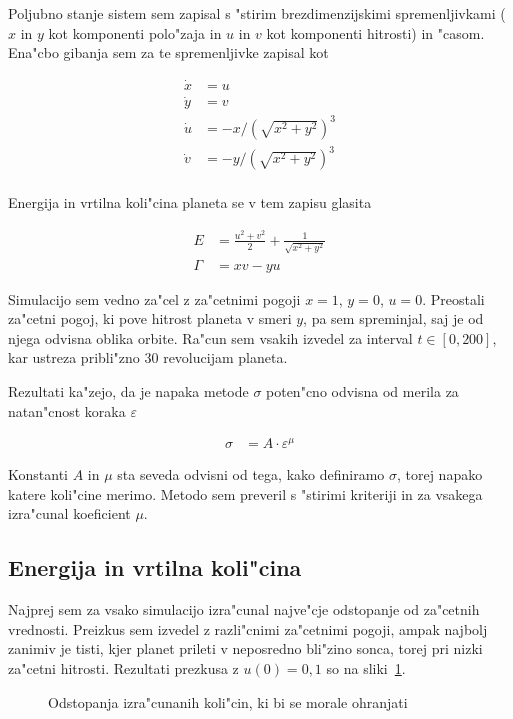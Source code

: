 \documentclass[a4paper,10pt]{article}
\newcommand{\eps}{\varepsilon}
\begin{document}
Poljubno stanje sistem sem zapisal s "stirim brezdimenzijskimi spremenljivkami ($x$ in $y$ kot komponenti polo"zaja in $u$ in $v$ kot komponenti hitrosti) in "casom. Ena"cbo gibanja sem za te spremenljivke zapisal kot

\begin{align}
 \dot x &= u \\
 \dot y &= v \\
 \dot u &= -x / (\sqrt{x^2 + y^2})^3 \\
 \dot v &= -y / (\sqrt{x^2 + y^2})^3 \\
\end{align}

Energija in vrtilna koli"cina planeta se v tem zapisu glasita

\begin{align}
 E &= \frac{u^2 + v^2}{2} + \frac{1}{\sqrt{x^2 + y^2}} \\
 \Gamma &= xv - yu
\end{align}

Simulacijo sem vedno za"cel z za"cetnimi pogoji $x=1$, $y=0$, $u=0$. Preostali za"cetni pogoj, ki pove hitrost planeta v smeri $y$, pa sem spreminjal, saj je od njega odvisna oblika orbite. Ra"cun sem vsakih izvedel za interval $t\in[0,200]$, kar ustreza pribli"zno 30 revolucijam planeta. 

Rezultati ka"zejo, da je napaka metode $\sigma$ poten"cno odvisna od merila za natan"cnost koraka $\eps$

\begin{align}
 \sigma &= A \cdot \eps^\mu
\end{align}

Konstanti $A$ in $\mu$ sta seveda odvisni od tega, kako definiramo $\sigma$, torej napako katere koli"cine merimo. Metodo sem preveril s "stirimi kriteriji in za vsakega izra"cunal koeficient $\mu$. 

\subsection{Energija in vrtilna koli"cina}

Najprej sem za vsako simulacijo izra"cunal najve"cje odstopanje od za"cetnih vrednosti. Preizkus sem izvedel z razli"cnimi za"cetnimi pogoji, ampak najbolj zanimiv je tisti, kjer planet prileti v neposredno bli"zino sonca, torej pri nizki za"cetni hitrosti. Rezultati prezkusa z $u(0) = 0,1$ so na sliki~\ref{fig:test-napake}. 

\begin{figure}[H]
 \centering
 
 \caption{Odstopanja izra"cunanih koli"cin, ki bi se morale ohranjati}
 \label{fig:test-napake}
\end{figure}
\end{document}
